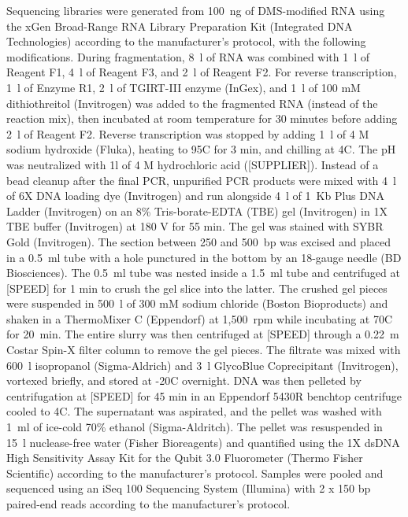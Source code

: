 \documentclass[main.tex]{subfiles}
\begin{document}
Sequencing libraries were generated from 100~ng of DMS-modified RNA using the xGen Broad-Range RNA Library Preparation Kit (Integrated DNA Technologies) according to the manufacturer’s protocol, with the following modifications.
During fragmentation, 8~\textmu l of RNA was combined with 1~\textmu l of Reagent F1, 4~\textmu l of Reagent F3, and 2~\textmu l of Reagent F2. 
For reverse transcription, 1~\textmu l of Enzyme R1, 2~\textmu l of TGIRT-III enzyme (InGex), and 1~\textmu l of 100 mM dithiothreitol (Invitrogen) was added to the fragmented RNA (instead of the reaction mix), then incubated at room temperature for 30 minutes before adding 2~\textmu l of Reagent F2.
Reverse transcription was stopped by adding 1~\textmu l of 4 M sodium hydroxide (Fluka), heating to 95\textdegree C for 3 min, and chilling at 4\textdegree C.
The pH was neutralized with 1\textmu l of 4 M hydrochloric acid ([SUPPLIER]).
Instead of a bead cleanup after the final PCR, unpurified PCR products were mixed with 4~\textmu l of 6X DNA loading dye (Invitrogen) and run alongside 4~\textmu l of 1~Kb Plus DNA Ladder (Invitrogen) on an 8\% Tris-borate-EDTA (TBE) gel (Invitrogen) in 1X TBE buffer (Invitrogen) at 180 V for 55 min.
The gel was stained with SYBR Gold (Invitrogen).
The section between 250 and 500~bp was excised and placed in a 0.5~ml tube with a hole punctured in the bottom by an 18-gauge needle (BD Biosciences).
The 0.5~ml tube was nested inside a 1.5~ml tube and centrifuged at [SPEED] for 1 min to crush the gel slice into the latter.
The crushed gel pieces were suspended in 500~\textmu l of 300 mM sodium chloride (Boston Bioproducts) and shaken in a ThermoMixer C (Eppendorf) at 1,500~rpm while incubating at 70\textdegree C for 20~min.
The entire slurry was then centrifuged at [SPEED] through a 0.22~\textmu m Costar Spin-X filter column to remove the gel pieces.
The filtrate was mixed with 600~\textmu l isopropanol (Sigma-Aldrich) and 3~\textmu l GlycoBlue Coprecipitant (Invitrogen), vortexed briefly, and stored at -20\textdegree C overnight.
DNA was then pelleted by centrifugation at [SPEED] for 45 min in an Eppendorf 5430R benchtop centrifuge cooled to 4\textdegree C.
The supernatant was aspirated, and the pellet was washed with 1~ml of ice-cold 70\% ethanol (Sigma-Aldritch).
The pellet was resuspended in 15~\textmu l nuclease-free water (Fisher Bioreagents) and quantified using the 1X dsDNA High Sensitivity Assay Kit for the Qubit 3.0 Fluorometer (Thermo Fisher Scientific) according to the manufacturer's protocol.
Samples were pooled and sequenced using an iSeq 100 Sequencing System (Illumina) with 2 x 150 bp paired-end reads according to the manufacturer's protocol.
\end{document}
